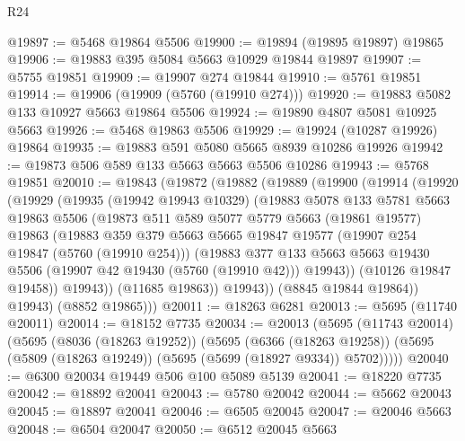 \begin{lexlean}{R24}
\begin{coremodule}
@19897 := @5468 @19864 @5506
@19900 := @19894 (@19895 @19897) @19865
@19906 := @19883 @395 @5084 @5663 @10929 @19844 @19897
@19907 := @5755 @19851
@19909 := @19907 @274 @19844
@19910 := @5761 @19851
@19914 := @19906 (@19909 (@5760 (@19910 @274)))
@19920 := @19883 @5082 @133 @10927 @5663 @19864 @5506
@19924 := @19890 @4807 @5081 @10925 @5663
@19926 := @5468 @19863 @5506
@19929 := @19924 (@10287 @19926) @19864
@19935 := @19883 @591 @5080 @5665 @8939 @10286 @19926
@19942 := @19873 @506 @589 @133 @5663 @5663 @5506 @10286
@19943 := @5768 @19851
@20010 := @19843
    (@19872
      (@19882
        (@19889
          (@19900
            (@19914
              (@19920
                (@19929
                  (@19935
                    (@19942 @19943 @10329)
                    (@19883
                      @5078
                      @133
                      @5781
                      @5663
                      @19863
                      @5506
                      (@19873
                        @511
                        @589
                        @5077
                        @5779
                        @5663
                        (@19861 @19577)
                        @19863
                        (@19883
                          @359
                          @379
                          @5663
                          @5665
                          @19847
                          @19577
                          (@19907 @254 @19847 (@5760 (@19910 @254)))
                          (@19883
                            @377
                            @133
                            @5663
                            @5663
                            @19430
                            @5506
                            (@19907 @42 @19430 (@5760 (@19910 @42)))
                            @19943))
                        (@10126 @19847 @19458))
                      @19943))
                  (@11685 @19863))
                @19943))
            (@8845 @19844 @19864))
          @19943)
        (@8852 @19865)))
@20011 := @18263 @6281
@20013 := @5695 (@11740 @20011)
@20014 := @18152 @7735
@20034 := @20013
    (@5695
      (@11743 @20014)
      (@5695
        (@8036 (@18263 @19252))
        (@5695
          (@6366 (@18263 @19258))
          (@5695 (@5809 (@18263 @19249)) (@5695 (@5699 (@18927 @9334)) @5702)))))
@20040 := @6300 @20034 @19449 @506 @100 @5089 @5139
@20041 := @18220 @7735
@20042 := @18892 @20041
@20043 := @5780 @20042
@20044 := @5662 @20043
@20045 := @18897 @20041
@20046 := @6505 @20045
@20047 := @20046 @5663
@20048 := @6504 @20047
@20050 := @6512 @20045 @5663

\end{coremodule}
\end{lexlean}
